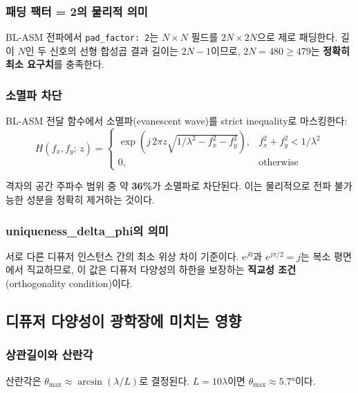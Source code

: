 \documentclass[11pt, a4paper]{article}
\newcommand{\blasm}{BL-ASM}
\begin{document}
\subsubsection{패딩 팩터 = 2의 물리적 의미}

\blasm{} 전파에서 \texttt{pad\_factor: 2}는 $N \times N$ 필드를 $2N \times 2N$으로 제로 패딩한다. 길이 $N$인 두 신호의 선형 합성곱 결과 길이는 $2N-1$이므로, $2N = 480 \geq 479$는 \textbf{정확히 최소 요구치}를 충족한다.

\subsubsection{소멸파 차단}

\blasm{} 전달 함수에서 소멸파(evanescent wave)를 strict inequality로 마스킹한다:
\begin{equation}
  H(f_x, f_y;\,z) = \begin{cases}
    \exp\!\left(j\,2\pi z\sqrt{1/\lambda^2 - f_x^2 - f_y^2}\right), & f_x^2 + f_y^2 < 1/\lambda^2 \\
    0, & \text{otherwise}
  \end{cases}
\end{equation}

격자의 공간 주파수 범위 중 약 \textbf{36\%}가 소멸파로 차단된다. 이는 물리적으로 전파 불가능한 성분을 정확히 제거하는 것이다.

\subsubsection{uniqueness\_delta\_phi의 의미}

서로 다른 디퓨저 인스턴스 간의 최소 위상 차이 기준이다. $e^{j0}$과 $e^{j\pi/2} = j$는 복소 평면에서 직교하므로, 이 값은 디퓨저 다양성의 하한을 보장하는 \textbf{직교성 조건}(orthogonality condition)이다.

\subsection{디퓨저 다양성이 광학장에 미치는 영향}

\subsubsection{상관길이와 산란각}

산란각은 $\theta_\text{max} \approx \arcsin(\lambda/L)$로 결정된다. $L = 10\lambda$이면 $\theta_\text{max} \approx 5.7°$이다.
\end{document}
